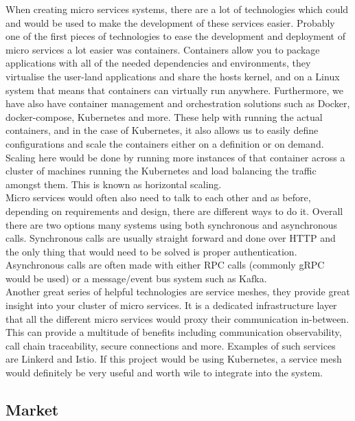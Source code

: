 \documentclass{article}
\newcommand{\vspaceconst}{-2ex}
\begin{document}
\begin{multicols}{2}
  When creating micro services systems, there are a lot of technologies which could and would be used to make the development of these services easier. Probably one of the first pieces of technologies to ease the development and deployment of micro services a lot easier was containers. Containers allow you to package applications with all of the needed dependencies and environments, they virtualise the user-land applications and share the hosts kernel, and on a Linux system that means that containers can virtually run anywhere. Furthermore, we have also have container management and orchestration solutions such as Docker\cite{Docker}, docker-compose\cite{Docker}, Kubernetes\cite{k8s} and more. These help with running the actual containers, and in the case of Kubernetes, it also allows us to easily define configurations and scale the containers either on a definition or on demand. Scaling here would be done by running more instances of that container across a cluster of machines running the Kubernetes and load balancing the traffic amongst them. This is known as horizontal scaling.\\
Micro services would often also need to talk to each other and as before, depending on requirements and design, there are different ways to do it. Overall there are two options many systems using both synchronous and asynchronous calls. Synchronous calls are usually straight forward and done over HTTP and the only thing that would need to be solved is proper authentication. Asynchronous calls are often made with either RPC calls (commonly gRPC\cite{grpc} would be used) or a message/event bus system such as Kafka\cite{kafka}.\\
  Another great series of helpful technologies are service meshes, they provide great insight into your cluster of micro services. It is a dedicated infrastructure layer that all the different micro services would proxy their communication in-between. This can provide a multitude of benefits including communication observability, call chain traceability, secure connections and more. Examples of such services are Linkerd\cite{linkerd} and Istio\cite{istio}. If this project would be using Kubernetes, a service mesh would definitely be very useful and worth wile to integrate into the system.\\

\subsection{Market} %
\vspace{\vspaceconst}


\end{multicols}
\end{document}
